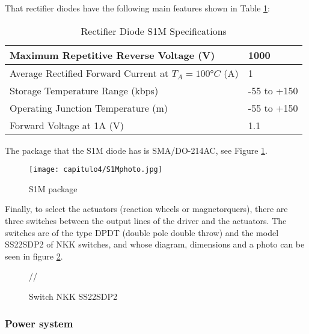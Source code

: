 That rectifier diodes have the following main features shown in Table \ref{tab:S1Mtab}:

\begin{table}[H]
\centering
\begin{tabular}{|l|l|}
\hline
Maximum Repetitive Reverse Voltage (V) & 1000 \\ \hline
Average Rectified Forward Current at $T_A = 100°C$       (A)     & 1     \\ \hline
Storage Temperature Range     (kbps)         &  -55 to +150         \\ \hline
Operating Junction Temperature (m)          & -55 to +150     \\ \hline
Forward Voltage at 1A (V)      &  1.1                         \\ \hline
\end{tabular}
\caption{Rectifier Diode S1M Specifications \cite{S1M} }\label{tab:S1Mtab}
\end{table}

The package that the S1M diode has is SMA/DO-214AC, see Figure \ref{fig:S1Mphoto}.

\begin{figure}[H]
	\centering
		\texttt{[image: capitulo4/S1Mphoto.jpg]}
	\caption{S1M package\cite{L298P}}
	\label{fig:S1Mphoto}
\end{figure}

Finally, to select the actuators (reaction wheels or magnetorquers), there are three switches between the output lines of the driver and the actuators. The switches are of the type DPDT (double pole double throw) and the model SS22SDP2 of NKK switches, and whose diagram, dimensions and a photo  can be seen in figure \ref{fig:switch}.


\begin{figure}[H]
\centering
{}
 //
\caption{Switch NKK SS22SDP2} \label{fig:switch}
\end{figure}

\subsubsection{Power system} \label{sssec:powersystem}

